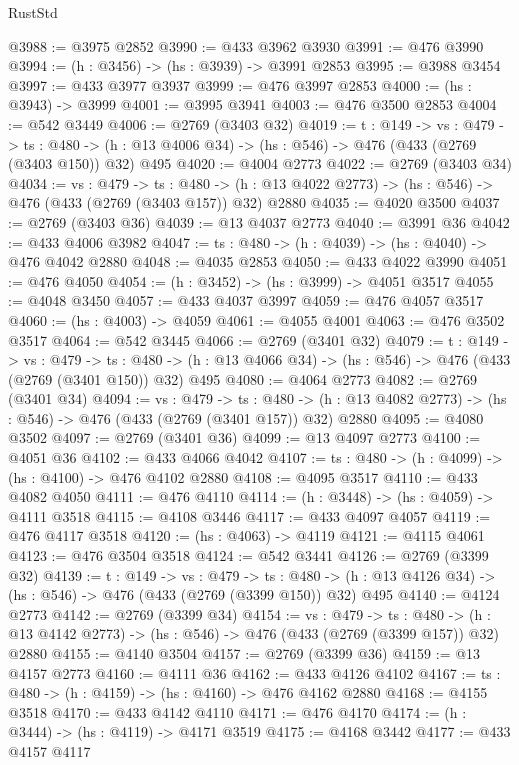 \begin{lexlean}{RustStd}
\begin{coremodule}
@3988 := @3975 @2852
@3990 := @433 @3962 @3930
@3991 := @476 @3990
@3994 := (h : @3456) -> (hs : @3939) -> @3991 @2853
@3995 := @3988 @3454
@3997 := @433 @3977 @3937
@3999 := @476 @3997 @2853
@4000 := (hs : @3943) -> @3999
@4001 := @3995 @3941
@4003 := @476 @3500 @2853
@4004 := @542 @3449
@4006 := @2769 (@3403 @32)
@4019 := {t : @149} ->
  {vs : @479} ->
  {ts : @480} -> (h : @13 @4006 @34) -> (hs : @546) -> @476 (@433 (@2769 (@3403 @150)) @32) @495
@4020 := @4004 @2773
@4022 := @2769 (@3403 @34)
@4034 := {vs : @479} ->
  {ts : @480} -> (h : @13 @4022 @2773) -> (hs : @546) -> @476 (@433 (@2769 (@3403 @157)) @32) @2880
@4035 := @4020 @3500
@4037 := @2769 (@3403 @36)
@4039 := @13 @4037 @2773
@4040 := @3991 @36
@4042 := @433 @4006 @3982
@4047 := {ts : @480} -> (h : @4039) -> (hs : @4040) -> @476 @4042 @2880
@4048 := @4035 @2853
@4050 := @433 @4022 @3990
@4051 := @476 @4050
@4054 := (h : @3452) -> (hs : @3999) -> @4051 @3517
@4055 := @4048 @3450
@4057 := @433 @4037 @3997
@4059 := @476 @4057 @3517
@4060 := (hs : @4003) -> @4059
@4061 := @4055 @4001
@4063 := @476 @3502 @3517
@4064 := @542 @3445
@4066 := @2769 (@3401 @32)
@4079 := {t : @149} ->
  {vs : @479} ->
  {ts : @480} -> (h : @13 @4066 @34) -> (hs : @546) -> @476 (@433 (@2769 (@3401 @150)) @32) @495
@4080 := @4064 @2773
@4082 := @2769 (@3401 @34)
@4094 := {vs : @479} ->
  {ts : @480} -> (h : @13 @4082 @2773) -> (hs : @546) -> @476 (@433 (@2769 (@3401 @157)) @32) @2880
@4095 := @4080 @3502
@4097 := @2769 (@3401 @36)
@4099 := @13 @4097 @2773
@4100 := @4051 @36
@4102 := @433 @4066 @4042
@4107 := {ts : @480} -> (h : @4099) -> (hs : @4100) -> @476 @4102 @2880
@4108 := @4095 @3517
@4110 := @433 @4082 @4050
@4111 := @476 @4110
@4114 := (h : @3448) -> (hs : @4059) -> @4111 @3518
@4115 := @4108 @3446
@4117 := @433 @4097 @4057
@4119 := @476 @4117 @3518
@4120 := (hs : @4063) -> @4119
@4121 := @4115 @4061
@4123 := @476 @3504 @3518
@4124 := @542 @3441
@4126 := @2769 (@3399 @32)
@4139 := {t : @149} ->
  {vs : @479} ->
  {ts : @480} -> (h : @13 @4126 @34) -> (hs : @546) -> @476 (@433 (@2769 (@3399 @150)) @32) @495
@4140 := @4124 @2773
@4142 := @2769 (@3399 @34)
@4154 := {vs : @479} ->
  {ts : @480} -> (h : @13 @4142 @2773) -> (hs : @546) -> @476 (@433 (@2769 (@3399 @157)) @32) @2880
@4155 := @4140 @3504
@4157 := @2769 (@3399 @36)
@4159 := @13 @4157 @2773
@4160 := @4111 @36
@4162 := @433 @4126 @4102
@4167 := {ts : @480} -> (h : @4159) -> (hs : @4160) -> @476 @4162 @2880
@4168 := @4155 @3518
@4170 := @433 @4142 @4110
@4171 := @476 @4170
@4174 := (h : @3444) -> (hs : @4119) -> @4171 @3519
@4175 := @4168 @3442
@4177 := @433 @4157 @4117

\end{coremodule}
\end{lexlean}
